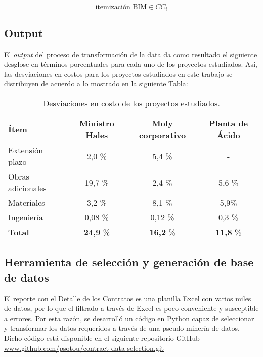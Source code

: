 \begin{equation}
    \text{itemización BIM} \in CC_i
\end{equation}

\subsection{Output}

El \emph{output} del proceso de transformación de la data da como resultado el siguiente desglose en términos porcentuales para cada uno de los proyectos estudiados. Así, las desviaciones en costos para los proyectos estudiados en este trabajo se distribuyen de acuerdo a lo mostrado en la siguiente Tabla:

\begin{table}[H]
    \centering
    \label{tab.datos_desv_proy}
    \caption{Desviaciones en costo de los proyectos estudiados.}
    \begin{tabular}{lccc}
        \toprule 
        Ítem              & Ministro Hales   & Moly corporativo & Planta de Ácido \\
        \midrule
        Extensión plazo   & 2,0 \%           & 5,4 \%           & -       \\
        Obras adicionales & 19,7 \%          & 2,4 \%           & 5,6 \%  \\
        Materiales        & 3,2 \%           & 8,1 \%           & 5,9\%   \\       
        Ingeniería        & 0,08 \%          & 0,12 \%          & 0,3 \%  \\
        \hline
        \textbf{Total}    & \textbf{24,9} \% & \textbf{16,2} \% & \textbf{11,8} \% \\
        \bottomrule
    \end{tabular}
\end{table}

\subsection{Herramienta de selección y generación de base de datos}

El reporte con el Detalle de los Contratos es una planilla Excel con varios miles de datos, por lo que el filtrado a través de Excel es poco conveniente y susceptible a errores. Por esta razón, se desarrolló un código en Python capaz de seleccionar y transformar los datos requeridos a través de una pseudo minería de datos. Dicho código está disponible en el siguiente repositorio GitHub \url{www.github.com/psotou/contract-data-selection.git}

